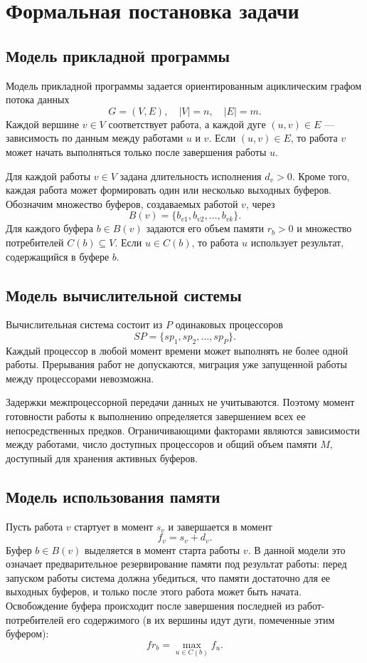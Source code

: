 \section{Формальная постановка задачи}
\label{sec:2_problem_statement} 

\subsection{Модель прикладной программы}
Модель прикладной программы задается ориентированным ациклическим графом потока данных
\[
G = (V, E), \quad |V| = n, \quad |E| = m.
\]
Каждой вершине $v \in V$ соответствует работа, а каждой дуге $(u, v) \in E$ — зависимость по данным между работами $u$ и $v$. Если $(u, v) \in E$, то работа $v$ может начать выполняться только после завершения работы $u$.

Для каждой работы $v \in V$ задана длительность исполнения $d_v > 0$. Кроме того, каждая работа может формировать один или несколько выходных буферов. Обозначим множество буферов, создаваемых работой $v$, через
\[
B(v) = \{b_{v1}, b_{v2}, \dots, b_{vk}\}.
\]
Для каждого буфера $b \in B(v)$ задаются его объем памяти $r_b > 0$ и множество потребителей $C(b) \subseteq V$. Если $u \in C(b)$, то работа $u$ использует результат, содержащийся в буфере $b$.

\subsection{Модель вычислительной системы}
Вычислительная система состоит из $P$ одинаковых процессоров
\[
SP = \{sp_1, sp_2, \dots, sp_P\}.
\]
Каждый процессор в любой момент времени может выполнять не более одной работы. Прерывания работ не допускаются, миграция уже запущенной работы между процессорами невозможна.

Задержки межпроцессорной передачи данных не учитываются. Поэтому момент готовности работы к выполнению определяется завершением всех ее непосредственных предков. Ограничивающими факторами являются зависимости между работами, число доступных процессоров и общий объем памяти $M$, доступный для хранения активных буферов.

\subsection{Модель использования памяти}
Пусть работа $v$ стартует в момент $s_v$ и завершается в момент
\[
f_v = s_v + d_v.
\]
Буфер $b \in B(v)$ выделяется в момент старта работы $v$. В данной модели это означает предварительное резервирование памяти под результат работы: перед запуском работы система должна убедиться, что памяти достаточно для ее выходных буферов, и только после этого работа может быть начата. Освобождение буфера происходит после завершения последней из работ-потребителей его содержимого (в их вершины идут дуги, помеченные этим буфером):
\[
fr_b = \max_{u \in C(b)} f_u.
\]

